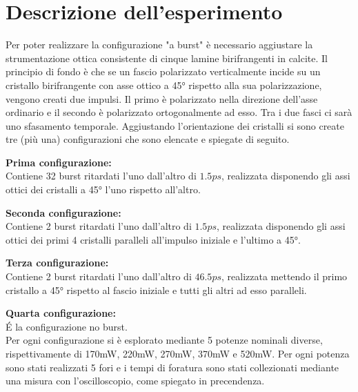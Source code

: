 \documentclass{article}
\begin{document}
\section{Descrizione dell'esperimento}
Per poter realizzare la configurazione "a burst" è necessario aggiustare la strumentazione ottica consistente di cinque lamine birifrangenti in calcite.
Il principio di fondo è che se un fascio polarizzato verticalmente incide su un cristallo birifrangente con asse ottico a 45° rispetto alla sua polarizzazione, vengono creati due impulsi. Il primo è polarizzato nella direzione dell'asse ordinario e il secondo è polarizzato ortogonalmente ad esso.
Tra i due fasci ci sarà uno sfasamento temporale. 
Aggiustando l'orientazione dei cristalli si sono create tre (più una) configurazioni che sono elencate e spiegate di seguito.

\textbf{Prima configurazione:\\}
Contiene 32 burst ritardati l'uno dall'altro di $1.5ps$, realizzata disponendo gli assi ottici dei cristalli a 45° l'uno rispetto all'altro.

\textbf{Seconda configurazione:\\}
Contiene 2 burst ritardati l'uno dall'altro di $1.5ps$, realizzata disponendo gli assi ottici dei primi 4 cristalli paralleli all'impulso iniziale e l'ultimo a 45°.

\textbf{Terza configurazione:\\}
Contiene 2 burst ritardati l'uno dall'altro di $46.5ps$, realizzata mettendo il primo cristallo a 45° rispetto al fascio iniziale e tutti gli altri ad esso paralleli. 

\textbf{Quarta configurazione:\\}
É la configurazione no burst. 
\\
Per ogni configurazione si è esplorato mediante 5 potenze nominali diverse, rispettivamente di 170mW, 220mW, 270mW, 370mW e 520mW.
Per ogni potenza sono stati realizzati 5 fori e i tempi di foratura sono stati collezionati mediante una misura con l'oscilloscopio, come spiegato in precendenza.
\end{document}
